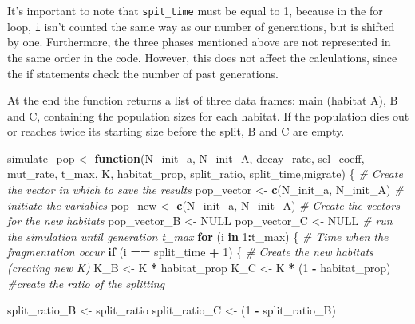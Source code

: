 \documentclass[
]{article}
\newenvironment{Shaded}{\begin{snugshade}}{\end{snugshade}}
\newcommand{\CommentTok}[1]{\textcolor[rgb]{0.56,0.35,0.01}{\textit{#1}}}
\newcommand{\ConstantTok}[1]{\textcolor[rgb]{0.56,0.35,0.01}{#1}}
\newcommand{\ControlFlowTok}[1]{\textcolor[rgb]{0.13,0.29,0.53}{\textbf{#1}}}
\newcommand{\DecValTok}[1]{\textcolor[rgb]{0.00,0.00,0.81}{#1}}
\newcommand{\FunctionTok}[1]{\textcolor[rgb]{0.13,0.29,0.53}{\textbf{#1}}}
\newcommand{\NormalTok}[1]{#1}
\newcommand{\OtherTok}[1]{\textcolor[rgb]{0.56,0.35,0.01}{#1}}
\newcommand{\SpecialCharTok}[1]{\textcolor[rgb]{0.81,0.36,0.00}{\textbf{#1}}}
\begin{document}
It's important to note that \texttt{spit\_time} must be equal to 1,
because in the for loop, \texttt{i} isn't counted the same way as our
number of generations, but is shifted by one. Furthermore, the three
phases mentioned above are not represented in the same order in the
code. However, this does not affect the calculations, since the if
statements check the number of past generations.

At the end the function returns a list of three data frames: main
(habitat A), B and C, containing the population sizes for each habitat.
If the population dies out or reaches twice its starting size before the
split, B and C are empty.

\begin{Shaded}
\begin{Highlighting}[]
\NormalTok{simulate\_pop }\OtherTok{\textless{}{-}} \ControlFlowTok{function}\NormalTok{(N\_init\_a, N\_init\_A, decay\_rate, sel\_coeff, mut\_rate, t\_max, K, habitat\_prop, split\_ratio, split\_time,migrate) \{}
  \CommentTok{\# Create the vector in which to save the results}
\NormalTok{  pop\_vector }\OtherTok{\textless{}{-}} \FunctionTok{c}\NormalTok{(N\_init\_a, N\_init\_A)}
  \CommentTok{\# initiate the variables}
\NormalTok{  pop\_new }\OtherTok{\textless{}{-}} \FunctionTok{c}\NormalTok{(N\_init\_a, N\_init\_A)}
  \CommentTok{\# Create the vectors for the new habitats}
\NormalTok{  pop\_vector\_B }\OtherTok{\textless{}{-}} \ConstantTok{NULL}
\NormalTok{  pop\_vector\_C }\OtherTok{\textless{}{-}} \ConstantTok{NULL}
  \CommentTok{\# run the simulation until generation t\_max}
  \ControlFlowTok{for}\NormalTok{ (i }\ControlFlowTok{in} \DecValTok{1}\SpecialCharTok{:}\NormalTok{t\_max) \{}
    \CommentTok{\# Time when the fragmentation occur}
    \ControlFlowTok{if}\NormalTok{ (i }\SpecialCharTok{==}\NormalTok{ split\_time }\SpecialCharTok{+} \DecValTok{1}\NormalTok{) \{}
      \CommentTok{\# Create the new habitats (creating new K)}
\NormalTok{      K\_B }\OtherTok{\textless{}{-}}\NormalTok{ K }\SpecialCharTok{*}\NormalTok{ habitat\_prop}
\NormalTok{      K\_C }\OtherTok{\textless{}{-}}\NormalTok{ K }\SpecialCharTok{*}\NormalTok{ (}\DecValTok{1} \SpecialCharTok{{-}}\NormalTok{ habitat\_prop)}
      \CommentTok{\#create the ratio of the splitting}
     
\NormalTok{      split\_ratio\_B }\OtherTok{\textless{}{-}}\NormalTok{ split\_ratio}
\NormalTok{      split\_ratio\_C }\OtherTok{\textless{}{-}}\NormalTok{ (}\DecValTok{1} \SpecialCharTok{{-}}\NormalTok{ split\_ratio\_B)}
     

\end{Highlighting}
\end{Shaded}
\end{document}
